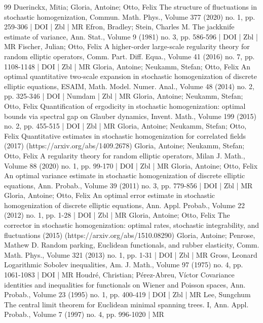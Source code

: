 \documentclass[10pt]{amsart}
\theoremstyle{definition}\newtheorem{defi}[theo]{Definition}\newtheorem{rema}[theo]{Remark}\newtheorem{exam}[theo]{Example}\newtheorem{exem}[theo]{Example}\newtheorem{nota}[theo]{Notation}
\begin{document}
\begin{thebibliography}{99}
Duerinckx, Mitia; Gloria, Antoine; Otto, Felix The structure of fluctuations in stochastic homogenization, Commun. Math. Phys., Volume 377 (2020) no. 1, pp. 259-306 | DOI | Zbl | MR
Efron, Bradley; Stein, Charles M. The jackknife estimate of variance, Ann. Stat., Volume 9 (1981) no. 3, pp. 586-596 | DOI | Zbl | MR
Fischer, Julian; Otto, Felix A higher-order large-scale regularity theory for random elliptic operators, Comm. Part. Diff. Equa., Volume 41 (2016) no. 7, pp. 1108-1148 | DOI | Zbl | MR
Gloria, Antoine; Neukamm, Stefan; Otto, Felix An optimal quantitative two-scale expansion in stochastic homogenization of discrete elliptic equations, ESAIM, Math. Model. Numer. Anal., Volume 48 (2014) no. 2, pp. 325-346 | DOI | Numdam | Zbl | MR
Gloria, Antoine; Neukamm, Stefan; Otto, Felix Quantification of ergodicity in stochastic homogenization: optimal bounds via spectral gap on Glauber dynamics, Invent. Math., Volume 199 (2015) no. 2, pp. 455-515 | DOI | Zbl | MR
Gloria, Antoine; Neukamm, Stefan; Otto, Felix Quantitative estimates in stochastic homogenization for correlated fields (2017) (https://arxiv.org/abs/1409.2678)
Gloria, Antoine; Neukamm, Stefan; Otto, Felix A regularity theory for random elliptic operators, Milan J. Math., Volume 88 (2020) no. 1, pp. 99-170 | DOI | Zbl | MR
Gloria, Antoine; Otto, Felix An optimal variance estimate in stochastic homogenization of discrete elliptic equations, Ann. Probab., Volume 39 (2011) no. 3, pp. 779-856 | DOI | Zbl | MR
Gloria, Antoine; Otto, Felix An optimal error estimate in stochastic homogenization of discrete elliptic equations, Ann. Appl. Probab., Volume 22 (2012) no. 1, pp. 1-28 | DOI | Zbl | MR
Gloria, Antoine; Otto, Felix The corrector in stochastic homogenization: optimal rates, stochastic integrability, and fluctuations (2015) (https://arxiv.org/abs/1510.08290)
Gloria, Antoine; Penrose, Mathew D. Random parking, Euclidean functionals, and rubber elasticity, Comm. Math. Phys., Volume 321 (2013) no. 1, pp. 1-31 | DOI | Zbl | MR
Gross, Leonard Logarithmic Sobolev inequalities, Am. J. Math., Volume 97 (1975) no. 4, pp. 1061-1083 | DOI | MR
Houdré, Christian; Pérez-Abreu, Víctor Covariance identities and inequalities for functionals on Wiener and Poisson spaces, Ann. Probab., Volume 23 (1995) no. 1, pp. 400-419 | DOI | Zbl | MR
Lee, Sungchum The central limit theorem for Euclidean minimal spanning trees. I, Ann. Appl. Probab., Volume 7 (1997) no. 4, pp. 996-1020 | MR

\end{thebibliography}
\end{document}
